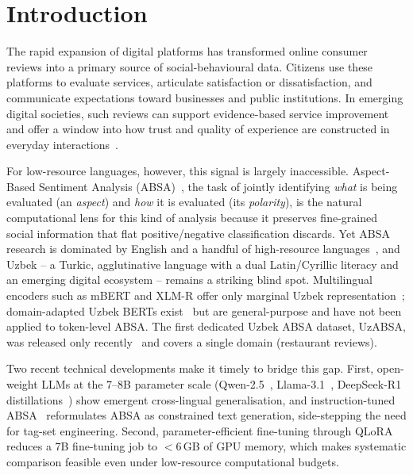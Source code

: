 \documentclass[runningheads]{llncs}
\begin{document}
\section{Introduction}
\label{sec:intro}

The rapid expansion of digital platforms has transformed online consumer
reviews into a primary source of social-behavioural data. Citizens use these
platforms to evaluate services, articulate satisfaction or dissatisfaction,
and communicate expectations toward businesses and public institutions. In
emerging digital societies, such reviews can support evidence-based service
improvement and offer a window into how trust and quality of experience are
constructed in everyday interactions~\cite{Hua2024,ZohrehMadhoushi2019}.

For low-resource languages, however, this signal is largely inaccessible.
Aspect-Based Sentiment Analysis (ABSA)~\cite{pontiki-etal-2014-semeval}, the
task of jointly identifying \emph{what} is being evaluated (an
\emph{aspect}) and \emph{how} it is evaluated (its \emph{polarity}), is the
natural computational lens for this kind of analysis because it preserves
fine-grained social information that flat positive/negative classification
discards. Yet ABSA research is dominated by English and a handful of
high-resource languages~\cite{Hua2024}, and Uzbek -- a Turkic, agglutinative
language with a dual Latin/Cyrillic literacy and an emerging digital
ecosystem -- remains a striking blind spot. Multilingual encoders such as
mBERT and XLM-R offer only marginal Uzbek
representation~\cite{devlin-etal-2019-bert,blasi-etal-2022-systematic};
domain-adapted Uzbek BERTs exist~\cite{kuriyozov-etal-2024-bertbek,Mamasaidov2023TahrirchiBERT} but are general-purpose and have not been
applied to token-level ABSA. The first dedicated Uzbek ABSA dataset, UzABSA,
was released only recently~\cite{matlatipov2024uzabsa} and covers a single
domain (restaurant reviews).

Two recent technical developments make it timely to bridge this gap.
First, open-weight LLMs at the 7--8B parameter scale (Qwen-2.5~\cite{Qwen2024-kr},
Llama-3.1~\cite{Grattafiori2024-ka}, DeepSeek-R1
distillations~\cite{DeepSeek-AI2026-vt}) show emergent cross-lingual
generalisation, and instruction-tuned ABSA~\cite{scaria-etal-2024-instructabsa,10.1145/3777411} reformulates ABSA as constrained text generation, side-stepping
the need for tag-set engineering. Second, parameter-efficient fine-tuning
through QLoRA~\cite{10.5555/3666122.3666563} reduces a 7B fine-tuning job to
$<6$\,GB of GPU memory, which makes systematic comparison feasible even
under low-resource computational budgets.
\end{document}
